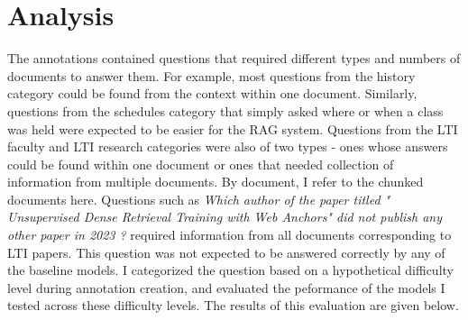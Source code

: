 \documentclass[11pt]{article}
\begin{document}
\section{Analysis}
The annotations contained questions that required different types and numbers of documents to answer them. For example, most questions from the history category could be found from the context within one document. Similarly, questions from the schedules category that simply asked where or when a class was held were expected to be easier for the RAG system.
Questions from the LTI faculty and LTI research categories were also of two types - ones whose answers could be found within one document or ones that needed collection of information from multiple documents. By document, I refer to the chunked documents here.
Questions such as \textit{Which author of the paper titled " Unsupervised Dense Retrieval Training with Web Anchors" did not publish any other paper in 2023 ?} required information from all documents corresponding to LTI papers. This question was not expected to be answered correctly by any of the baseline models.
I categorized the question based on a hypothetical difficulty level during annotation creation, and evaluated the peformance of the models I tested across these difficulty levels. The results of this evaluation are given below.
\end{document}
